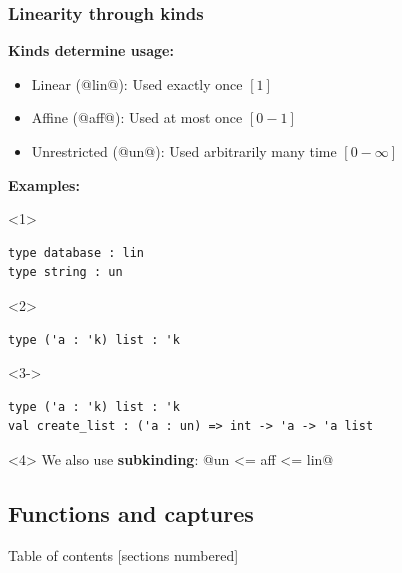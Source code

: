 \documentclass[aspectratio=169,dvipsnames,svgnames,10pt]{beamer}
\begin{document}
\begin{frame}[fragile]
  \frametitle{Linearity through kinds}
  
  \textbf{Kinds determine usage:}
  \begin{itemize}
  \item Linear (@lin@): Used exactly once $[1]$
  \item Affine (@aff@): Used at most once $[0-1]$
  \item Unrestricted (@un@): Used arbitrarily many time $[0-\infty]$
  \end{itemize}

  \textbf{Examples:}
  \begin{onlyenv}<1>
\begin{verbatim}
type database : lin
type string : un
\end{verbatim}
  \end{onlyenv}
  \begin{onlyenv}<2>
\begin{verbatim}
type ('a : 'k) list : 'k
\end{verbatim}
  \end{onlyenv}
  \begin{onlyenv}<3->
\begin{verbatim}
type ('a : 'k) list : 'k
val create_list : ('a : un) => int -> 'a -> 'a list
\end{verbatim}
    
    \begin{onlyenv}<4>
      We also use \textbf{subkinding}: @un <= aff <= lin@
    \end{onlyenv}
  \end{onlyenv}
\end{frame}


\subsection{Functions and captures}


\begin{frame}{Table of contents}
  [sections numbered]
\end{frame}
\end{document}

